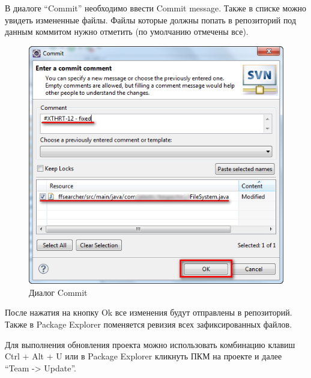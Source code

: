 \documentclass[a4paper,12pt]{article}
\begin{document}
В диалоге ``Commit''
необходимо ввести Commit message. Также в списке можно увидеть
измененные файлы. Файлы которые должны попать в репозиторий под данным
коммитом нужно отметить (по умолчанию отмечены все).

\begin{figure}[h!]
	\centering
	\includegraphics[scale=0.60]{eclipse-commit-2.png} 
	\vspace{-10pt}
	\caption{Диалог Commit}
\end{figure}
После нажатия на кнопку Ok все изменения будут отправлены в репозиторий. 
Также в Package Explorer поменяется ревизия всех зафиксированных файлов.

Для выполнения обновления проекта можно использовать комбинацию клавиш
Ctrl + Alt + U или в Package Explorer кликнуть ПКМ на проекте и далее
``Team -\textgreater{} Update''.
\end{document}
